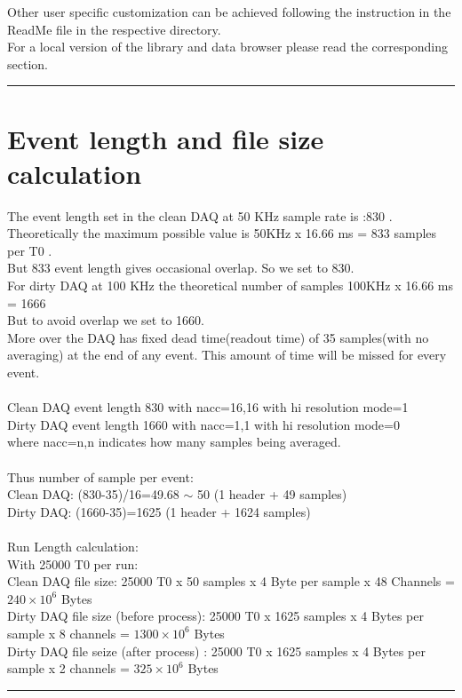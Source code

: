\documentclass[12pt]{article}
\begin{document}
Other user specific customization can be achieved following the instruction in the ReadMe file in the respective directory.\\
For a local version of the library and data browser please read the corresponding section.

\noindent
{\color{red} \rule{\linewidth}{1mm} }
 
\newpage
\section{Event length and file size calculation}
The  event length set in the clean DAQ at 50 KHz sample rate is :830 . Theoretically the maximum possible value is 50KHz x 16.66 ms = 833 samples per T0 . \\
But 833 event length gives occasional overlap. So we set to 830. \\
For dirty DAQ at 100 KHz the theoretical number of samples 100KHz x 16.66 ms = 1666 \\
But to avoid overlap we set to 1660. \\
More over the DAQ has fixed dead time(readout time) of 35 samples(with no averaging) at the end of any event. This amount of time will be missed for every event.\\
\\
Clean DAQ event length 830 with nacc=16,16 with hi resolution mode=1\\
Dirty DAQ event length 1660 with nacc=1,1 with hi resolution mode=0\\
where nacc=n,n indicates how many samples being averaged.\\
\\
Thus number of sample per event:\\
Clean DAQ: (830-35)/16=49.68 $\sim$ 50  (1 header + 49 samples)\\
Dirty DAQ: (1660-35)=1625 (1 header + 1624 samples) \\
\\
Run Length calculation:\\
With 25000 T0 per run: \\
Clean DAQ file size: 25000 T0 x 50 samples x 4 Byte per sample x 48 Channels =$240 \times 10^6$ Bytes\\
Dirty DAQ file size (before process): 25000 T0 x 1625 samples x 4 Bytes per sample x 8 channels = $1300 \times 10^6$ Bytes\\
Dirty DAQ file seize (after process) : 25000 T0 x 1625 samples x 4 Bytes per sample x 2 channels = $325 \times 10^6$ Bytes\\
\noindent
{\color{red} \rule{\linewidth}{1mm} }
 
\end{document}
